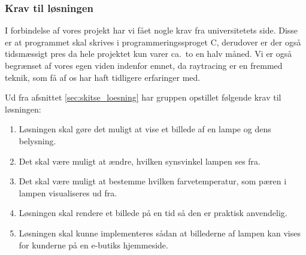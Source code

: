 \subsubsection{Krav til løsningen}
\label{sec:krav}

I forbindelse af vores projekt har vi fået nogle krav fra universitetets side. Disse er at programmet skal skrives i programmeringssproget C, derudover er der også tidsmæssigt pres da hele projektet kun varer ca.\ to en halv måned. 
Vi er også begrænset af vores egen viden indenfor emnet, da raytracing er en fremmed teknik, som få af os har haft tidligere erfaringer med. 

Ud fra afsnittet \ref{sec:skitse_loesning} har gruppen opstillet følgende krav til løsningen:
\begin{enumerate}
    \item Løsningen skal gøre det muligt at vise et billede af en lampe og dens belysning.
    \item Det skal være muligt at ændre, hvilken synsvinkel lampen ses fra.
    \item Det skal være muligt at bestemme hvilken farvetemperatur, som pæren i lampen visualiseres ud fra.
    \item Løsningen skal rendere et billede på en tid så den er praktisk anvendelig.
    \item Løsningen skal kunne implementeres sådan at billederne af lampen kan vises for kunderne på en e-butiks hjemmeside.
\end{enumerate}